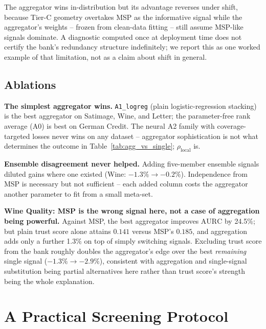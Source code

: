\documentclass[conference]{IEEEtran}
\newcommand{\aurc}{\mathrm{AURC}}
\newcommand{\rholocal}{\rho_{\mathrm{local}}}
\begin{document}
The aggregator wins in-distribution but its advantage reverses under shift, because Tier-C geometry overtakes MSP as the informative signal while the aggregator's weights -- frozen from clean-data fitting -- still assume MSP-like signals dominate. A diagnostic computed once at deployment time does not certify the bank's redundancy structure indefinitely; we report this as one worked example of that limitation, not as a claim about shift in general.

\subsection{Ablations}
\label{sec:ablations}

\textbf{The simplest aggregator wins.} \texttt{A1\_logreg} (plain logistic-regression stacking) is the best aggregator on Satimage, Wine, and Letter; the parameter-free rank average (A0) is best on German Credit. The neural A2 family with coverage-targeted losses never wins on any dataset -- aggregator sophistication is not what determines the outcome in Table~\ref{tab:agg_vs_single}; $\rholocal$ is.

\textbf{Ensemble disagreement never helped.} Adding five-member ensemble signals diluted gains where one existed (Wine: $-1.3\% \to -0.2\%$). Independence from MSP is necessary but not sufficient -- each added column costs the aggregator another parameter to fit from a small meta-set.

\textbf{Wine Quality: MSP is the wrong signal here, not a case of aggregation being powerful.} Against MSP, the best aggregator improves $\aurc$ by 24.5\%; but plain trust score alone attains $0.141$ versus MSP's $0.185$, and aggregation adds only a further 1.3\% on top of simply switching signals. Excluding trust score from the bank roughly doubles the aggregator's edge over the best \emph{remaining} single signal ($-1.3\% \to -2.9\%$), consistent with aggregation and single-signal substitution being partial alternatives here rather than trust score's strength being the whole explanation.

\section{A Practical Screening Protocol}
\label{sec:protocol}
\end{document}
